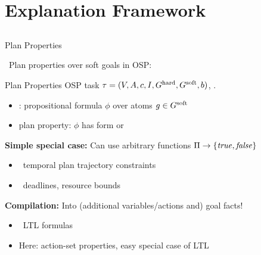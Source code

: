 \section[Framework]{Explanation Framework}
\subsection*{}

\begin{frame}{Plan Properties}

\notesym~Plan properties over soft goals in OSP:

\begin{mydef}{Plan Properties}
OSP task $\tau =
(V,\allowbreak A,\allowbreak{\ensuremath{c}},\allowbreak I,\allowbreak G^{\text{\textup{hard}}},\allowbreak G^{\text{\textup{soft}}},\allowbreak{\ensuremath{b}})$, .
\begin{itemize}
\item  {}: propositional formula $\phi$ over 
atoms $g \in G^{\text{\textup{soft}}}$
\item {} plan property: $\phi$ has form
 or 
\end{itemize}
%
%
\end{mydef}

\bigskip \pause

%
\textbf{Simple special case:} Can use arbitrary functions $\Pi \to \{\mathit{true}, \mathit{false}\}$

\begin{itemize}
\item \eg\ temporal plan trajectory constraints
\item \eg\ deadlines, resource bounds
\end{itemize}

\medskip \pause

\textbf{Compilation:} Into (additional variables/actions and) goal facts!

\begin{itemize}
\item \eg\ LTL formulas
\item Here: action-set properties, easy special case of LTL
\end{itemize}

\medskip

\end{frame}


